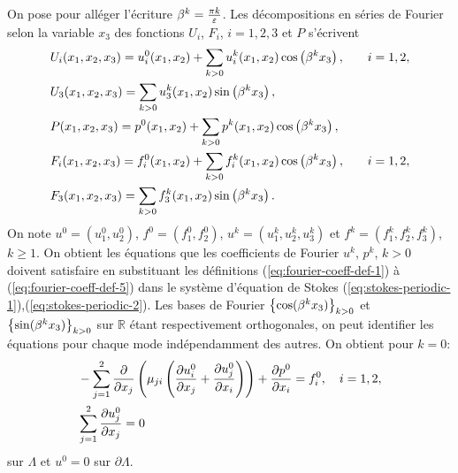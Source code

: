 On pose pour alléger l'écriture $\beta^k = \frac{\pi
k}{\varepsilon}$. Les décompositions en séries de Fourier selon la
variable $x_3$ des fonctions $U_i$, $F_i$, $i = 1,2,3$ et $P$ s'écrivent
\begin{align}
  &U_i(x_1, x_2, x_3) = u_i^0(x_1, x_2) %
                       + \sum_{k > 0} u_i^k(x_1, x_2)%
                       \cos\parent{\beta^kx_3}, &\quad i = 1, 2,\label{eq:fourier-coeff-def-1}\\
  &U_3(x_1, x_2, x_3) = \sum_{k > 0} u_3^k(x_1, x_2)%
                        \sin\parent{\beta^kx_3},\label{eq:fourier-coeff-def-2}\\
  &P(x_1, x_2, x_3) = p^0(x_1, x_2) %
                      + \sum_{k>0}p^k(x_1, x_2)%
                      \cos\parent{\beta^kx_3},\label{eq:fourier-coeff-def-3}\\
  &F_i(x_1, x_2, x_3) = f_i^0(x_1, x_2) %
                        + \sum_{k > 0}f_i^k(x_1, x_2)%
                        \cos\parent{\beta^kx_3}, &\quad i = 1,2,\label{eq:fourier-coeff-def-4}\\
  &F_3(x_1, x_2, x_3) = \sum_{k > 0}f_3^k(x_1,x_2)%
                        \sin\parent{\beta^kx_3}.\label{eq:fourier-coeff-def-5}
\end{align}
On note $u^0 = (u^0_1, u^0_2)$, $f^0 = (f^0_1, f^0_2)$, $u^k =
(u^k_1,u^k_2,u^k_3)$ et $f^k = (f^k_1, f^k_2, f^k_3)$, $k \geq 1$. On
obtient les équations que les coefficients de Fourier $u^k$, $p^k$,
$k>0$ doivent satisfaire en substituant les définitions
(\ref{eq:fourier-coeff-def-1}) à (\ref{eq:fourier-coeff-def-5}) dans
le système d'équation de Stokes
(\ref{eq:stokes-periodic-1}),(\ref{eq:stokes-periodic-2}). Les bases
de Fourier $\left\{ \cos(\beta^k x_3) \right\}_{k > 0}$ et
$\left\{ \sin(\beta^kx_3) \right\}_{k>0}$ sur $\mathbb R$ étant
respectivement orthogonales, on peut identifier les équations pour
chaque mode indépendamment des autres. On obtient pour $k = 0$:
\begin{align}
  &-\sum_{j = 1}^2\frac{\partial}{\partial
    x_j}\left( \mu_{ji}\left( \frac{\partial u_i^0}{\partial x_j} +
      \frac{\partial u_j^0}{\partial x_i} \right) \right) + \frac{\partial
    p^0}{\partial x_i} = f_i^0, \quad i = 1,2,\label{eq:fourier-fund-1}\\
  &\sum_{j = 1}^2 \frac{\partial u_j^0}{\partial x_j} = 0\label{eq:fourier-fund-2}
\end{align}
sur $\Lambda$ et $u^0 = 0$ sur $\partial \Lambda$.

